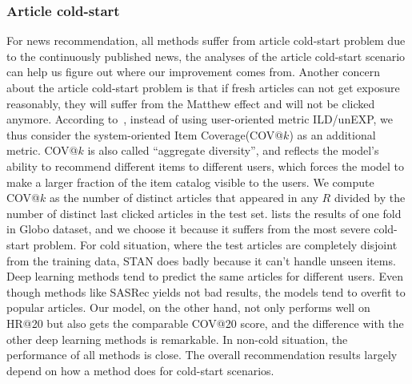 \subsubsection{Article cold-start}
\label{sec:itemcold}
For news recommendation, all methods suffer from article cold-start problem due to the continuously published news, the analyses of the article cold-start scenario can help us 
figure out where our improvement comes from. Another concern about the article cold-start problem is that if fresh articles can not get exposure reasonably, they will suffer from the Matthew effect and will not be clicked anymore. According to~\cite{gabriel2019contextual}, instead of using user-oriented metric ILD/unEXP, we thus consider the system-oriented Item Coverage(COV@$k$) as an additional metric. COV@$k$ is also called ``aggregate diversity'', and reflects the model's ability to recommend different items to different users, which forces the model to make a larger fraction of the item catalog visible to the users. We compute COV@$k$ as the number of distinct articles that appeared in any $R$ divided by the number of distinct last clicked articles in the test set. 
 lists the results of one fold in Globo dataset, and we choose it because it suffers from the most severe cold-start problem. 
For cold situation, where the test articles are completely disjoint from
the training data, STAN does badly because it can't handle unseen items.
Deep learning methods tend to predict the same articles for different users. 
Even though methods like SASRec yields not bad results, 
the models tend to overfit to popular articles. Our model, on the other hand, not only performs well on HR@20 but also gets the comparable COV@20 score, and the difference with the
other deep learning methods is remarkable. 
In non-cold situation, the performance of all methods is close. 
The overall recommendation results largely depend on how a method does for 
cold-start scenarios.

